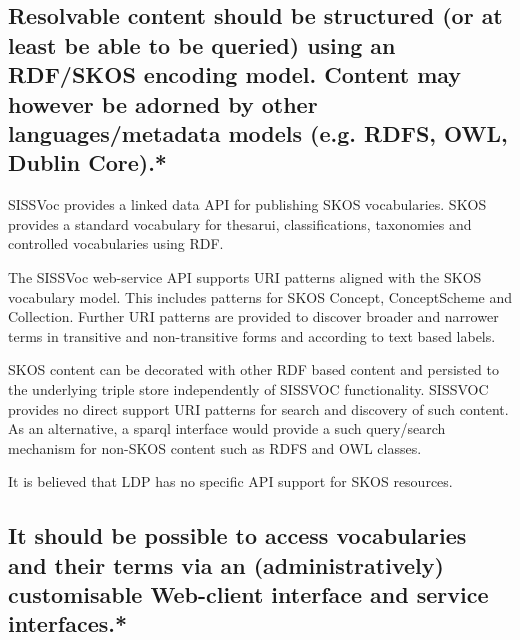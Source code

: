 \documentclass[10pt,a4paper]{article}
\begin{document}
\begin{flushleft}
\subsection{Resolvable content should be structured (or at least be able to be queried)
  using an RDF/SKOS encoding model. Content may however be adorned by other
  languages/metadata models (e.g. RDFS, OWL, Dublin Core).* }

  SISSVoc provides a linked data API for publishing SKOS vocabularies.  SKOS
provides a standard vocabulary for thesarui, classifications, taxonomies and
controlled vocabularies using RDF.

  The SISSVoc web-service API supports URI patterns aligned with the SKOS
vocabulary model. This includes patterns for SKOS Concept,
ConceptScheme and Collection. Further URI patterns are provided to discover
broader and narrower terms in transitive and non-transitive forms and according
to text based labels. 

  SKOS content can be decorated with other RDF based
content and persisted to the underlying triple store independently of SISSVOC
functionality. SISSVOC provides
no direct support URI patterns for search and discovery of such content. As an
alternative, a sparql interface would provide a
such query/search mechanism for non-SKOS content such as RDFS and OWL classes. 

It is believed that LDP has no specific API support for SKOS resources.

% 
% 
% 

  \subsection{
  It should be possible to access vocabularies and their terms via an 
  (administratively) customisable Web-client interface and service interfaces.* } 


\end{flushleft}
\end{document}
